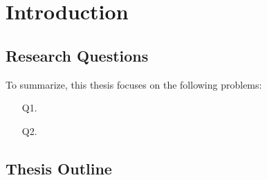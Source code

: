 \section{Introduction}
\lipsum[14]

\subsection{Research Questions}

To summarize, this thesis focuses on the following problems:


\begin{itemize}[leftmargin=0.85in]
    \item[Q1.  ] \lipsum[1][1] \\\lipsum[1][2]
    \item[Q2.  ] \lipsum[1][1] \\\lipsum[1][2]
\end{itemize}

\subsection{Thesis Outline}